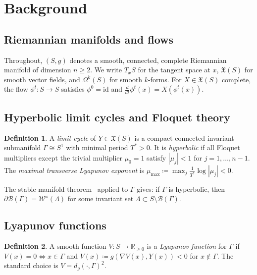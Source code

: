 \documentclass[12pt, oneside]{book}
\theoremstyle{plain}
\theoremstyle{definition}
\newtheorem{definition}{Definition}[section]
\theoremstyle{remark}
\newcommand{\R}{\mathbb{R}}
\newcommand{\Orb}{\Gamma}
\newcommand{\cB}{\mathcal{B}}
\newcommand{\dg}{d_g}
\newcommand{\abs}[1]{\left|#1\right|}
\begin{document}
\section{Background}\label{sec:background}

\subsection{Riemannian manifolds and flows}

Throughout, $(S,g)$ denotes a smooth, connected, complete Riemannian
manifold of dimension $n\ge 2$. We write $T_xS$ for the tangent space
at $x$, $\mathfrak{X}(S)$ for smooth vector fields, and $\Omega^k(S)$
for smooth $k$-forms. For $X\in\mathfrak{X}(S)$ complete, the flow
$\phi^t\colon S\to S$ satisfies $\phi^0=\mathrm{id}$ and
$\tfrac{d}{dt}\phi^t(x)=X(\phi^t(x))$.

\subsection{Hyperbolic limit cycles and Floquet theory}

\begin{definition}\label{def:limitcycle}
A \emph{limit cycle} of $Y\in\mathfrak{X}(S)$ is a compact connected
invariant submanifold $\Orb\cong S^1$ with minimal period $T^*>0$.
It is \emph{hyperbolic} if all Floquet multipliers except the trivial
multiplier $\mu_0=1$ satisfy $\abs{\mu_j}<1$ for $j=1,\ldots,n-1$.
The \emph{maximal transverse Lyapunov exponent} is
$\mu_{\max}\coloneqq\max_j\tfrac{1}{T^*}\log\abs{\mu_j}<0$.
\end{definition}

The stable manifold theorem~\cite{HPS} applied to $\Orb$ gives: if
$\Orb$ is hyperbolic, then $\partial\cB(\Orb)=\mathcal{W}^s(\Lambda)$
for some invariant set $\Lambda\subset S\setminus\cB(\Orb)$.

\subsection{Lyapunov functions}

\begin{definition}\label{def:lyapunov}
A smooth function $V\colon S\to\R_{\ge 0}$ is a \emph{Lyapunov function}
for $\Orb$ if $V(x)=0\iff x\in\Orb$ and
$\dot V(x)\coloneqq g(\nabla V(x),Y(x))<0$ for $x\notin\Orb$.
The standard choice is $V=\dg(\cdot,\Orb)^2$.
\end{definition}
\end{document}
